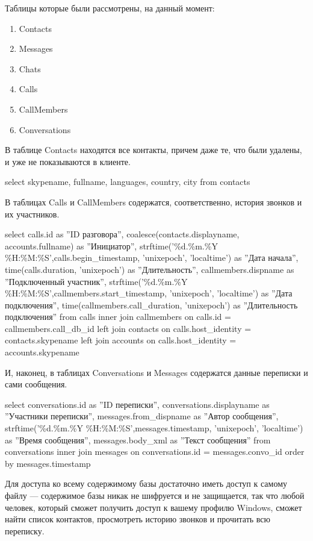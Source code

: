 Таблицы которые были рассмотрены, на данный момент:    
\begin{enumerate}
\item Contacts
\item Messages
\item Chats
\item Calls
\item CallMembers
\item Conversations
\end{enumerate}

В таблице Contacts находятся все контакты, причем даже те, что были удалены, и уже не показываются в клиенте.

\ttfamily
\noindent select skypename, fullname, languages, country, city from contacts
\normalfont

В таблицах Calls и CallMembers содержатся, соответственно, история звонков и их участников.

\ttfamily
\noindent select calls.id as ''ID разговора'', coalesce(contacts.displayname, accounts.fullname) as ''Инициатор'', strftime('\%d.\%m.\%Y \%H:\%M:\%S',calls.begin\_timestamp, 'unixepoch', 'localtime') as ''Дата начала'', time(calls.duration, 'unixepoch') as ''Длительность'', callmembers.dispname as ''Подключенный участник'', strftime('\%d.\%m.\%Y \%H:\%M:\%S',callmembers.start\_timestamp, 'unixepoch', 'localtime') as ''Дата подключения'', time(callmembers.call\_duration, 'unixepoch') as ''Длительность подключения'' from calls inner join callmembers on calls.id = callmembers.call\_db\_id left  join contacts on calls.host\_identity = contacts.skypename left  join accounts on calls.host\_identity = accounts.skypename
\normalfont

И, наконец, в таблицах Conversations и Messages содержатся данные переписки и сами сообщения.

\ttfamily
\noindent select conversations.id as ''ID переписки'', conversations.displayname as ''Участники переписки'', 
       messages.from\_dispname as ''Автор сообщения'',
       strftime('\%d.\%m.\%Y \%H:\%M:\%S',messages.timestamp, 'unixepoch', 'localtime') as ''Время сообщения'', 
       messages.body\_xml as ''Текст сообщения''
  from conversations
       inner join messages on conversations.id = messages.convo\_id
order by messages.timestamp
\normalfont

Для доступа ко всему содержимому базы достаточно иметь доступ к самому файлу — содержимое базы никак не шифруется и не защищается, так что любой человек, который сможет получить доступ к вашему профилю Windows, сможет найти список контактов, просмотреть историю звонков и прочитать всю переписку. 

